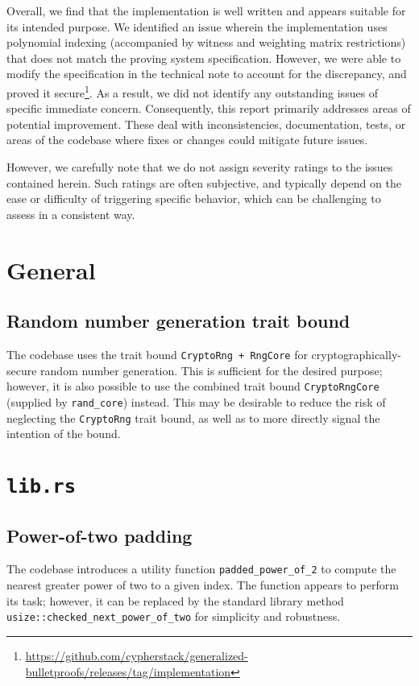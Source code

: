 \documentclass{article}
\begin{document}
Overall, we find that the implementation is well written and appears suitable for its intended purpose.
We identified an issue wherein the implementation uses polynomial indexing (accompanied by witness and weighting matrix restrictions) that does not match the proving system specification.
However, we were able to modify the specification in the technical note to account for the discrepancy, and proved it secure\footnote{\url{https://github.com/cypherstack/generalized-bulletproofs/releases/tag/implementation}}.
As a result, we did not identify any outstanding issues of specific immediate concern.
Consequently, this report primarily addresses areas of potential improvement.
These deal with inconsistencies, documentation, tests, or areas of the codebase where fixes or changes could mitigate future issues.

However, we carefully note that we do not assign severity ratings to the issues contained herein.
Such ratings are often subjective, and typically depend on the ease or difficulty of triggering specific behavior, which can be challenging to assess in a consistent way.


\section{General}

\subsection{Random number generation trait bound}

The codebase uses the trait bound \texttt{CryptoRng + RngCore} for cryptographically-secure random number generation.
This is sufficient for the desired purpose; however, it is also possible to use the combined trait bound \texttt{CryptoRngCore} (supplied by \texttt{rand\_core}) instead.
This may be desirable to reduce the risk of neglecting the \texttt{CryptoRng} trait bound, as well as to more directly signal the intention of the bound.


\section{\texttt{lib.rs}}

\subsection{Power-of-two padding}

The codebase introduces a utility function \texttt{padded\_power\_of\_2} to compute the nearest greater power of two to a given index.
The function appears to perform its task; however, it can be replaced by the standard library method \texttt{usize::checked\_next\_power\_of\_two} for simplicity and robustness.
\end{document}
